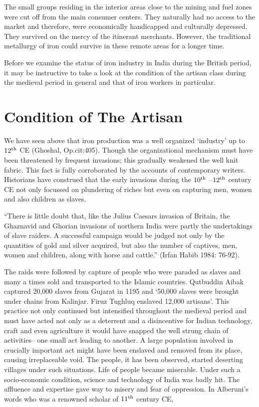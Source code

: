 The small groups residing in the interior areas close to the mining and fuel zones were cut off from the main consumer centers. They naturally had no access to the market and therefore, were economically handicapped and culturally depressed. They survived on the mercy of the itinerant merchants. However, the traditional metallurgy of iron could survive in these remote areas for a longer time.

Before we examine the status of iron industry in India during the British period, it may be instructive to take a look at the condition of the artisan class during the medieval period in general and that of iron workers in particular. 

\vspace{-.3cm}

\section*{Condition of The Artisan}\label{chapter5-section-4}

We have seen above that iron production was a well organized ‘industry’ up to $12^{\rm th}$ CE (Ghoshal, Op.cit:405). Though the organizational mechanism must have been threatened by frequent invasions; this gradually weakened the well knit fabric. This fact is fully corroborated by the accounts of contemporary writers. Historians have construed that the early invasions during the $10^{\rm th}$ –$12^{\rm th}$ century CE not only focussed on plundering of riches but even on capturing men, women and also children as slaves. 

“There is little doubt that, like the Julius Caesars invasion of Britain, the Ghaznavid and Ghorian invasions of northern India were partly the undertakings of slave raiders. A successful campaign would be judged not only by the quantities of gold and silver acquired, but also the number of captives, men, women and children, along with horse and cattle.” (Irfan Habib 1984: 76-92).

The raids were followed by capture of people who were paraded as slaves and many a times sold and transported to the Islamic countries. Qutbuddin Aibak captured 20,000 slaves from Gujarat in 1195 and `50,000 slaves were brought under chains from Kalinjar. Firuz Tughluq enslaved 12,000 artisans'. This practice not only continued but intensified throughout the medieval period and must have acted not only as a deterrent and a disincentive for Indian technology, craft and even agriculture it would have snapped the well strung chain of activities– one small act leading to another. A large population involved in crucially important act might have been enslaved and removed from its place, causing irreplaceable void. The people, it has been observed, started deserting villages under such situations. Life of people became miserable. Under such a socio-economic condition, science and technology of India was badly hit. The affluence and expertise gave way to misery and fear of oppression. In Alberuni's words who was a renowned scholar of $11^{\rm th}$ century CE,

